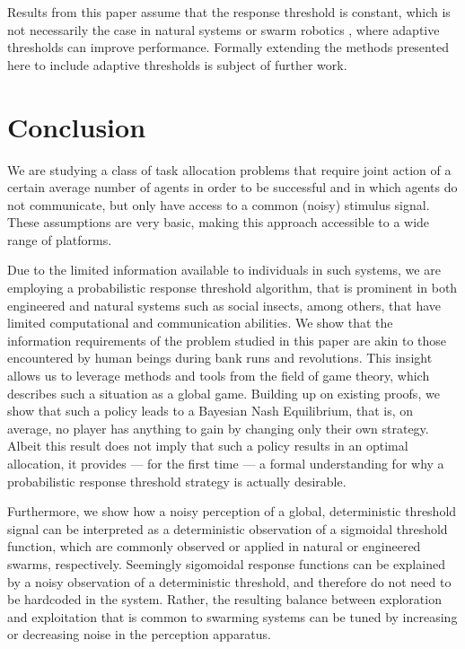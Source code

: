\documentclass[smallextended]{svjour3}       %
\begin{document}
Results from this paper assume that the response threshold is constant, which is not necessarily the case in natural systems or swarm robotics \citep{castello2016adaptive}, where adaptive thresholds can improve performance. Formally extending the methods presented here to include adaptive thresholds is subject of further work.

\section{Conclusion}
We are studying a class of task allocation problems that require joint action of a certain average number of agents in order to be successful and in which agents do not communicate, but only have access to a common (noisy) stimulus signal. These assumptions are very basic, making this approach accessible to a wide range of platforms. 

Due to the limited information available to individuals in such systems, we are employing a probabilistic response threshold algorithm, that is prominent in both engineered and natural systems such as social insects, among others, that have limited computational and communication abilities. We show that the information requirements of the problem studied in this paper are akin to those encountered by human beings during bank runs and revolutions. This insight allows us to leverage methods and tools from the field of game theory, which describes such a situation as a global game. Building up on existing proofs, we show that such a policy leads to a Bayesian Nash Equilibrium, that is, on average, no player has anything to gain by changing only their own strategy. Albeit this result does not imply that such a policy results in an optimal allocation, it provides --- for the first time --- a formal understanding for why a probabilistic response threshold strategy is actually desirable.

Furthermore, we show how a noisy perception of a global, deterministic threshold signal can be interpreted as a deterministic observation of a sigmoidal threshold function, which are commonly observed or applied in natural or engineered swarms, respectively. Seemingly sigomoidal response functions can be explained by a noisy observation of a deterministic threshold, and therefore do not need to be hardcoded in the system. Rather, the resulting balance between exploration and exploitation that is common to swarming systems can be tuned by increasing or decreasing noise in the perception apparatus.
\end{document}
